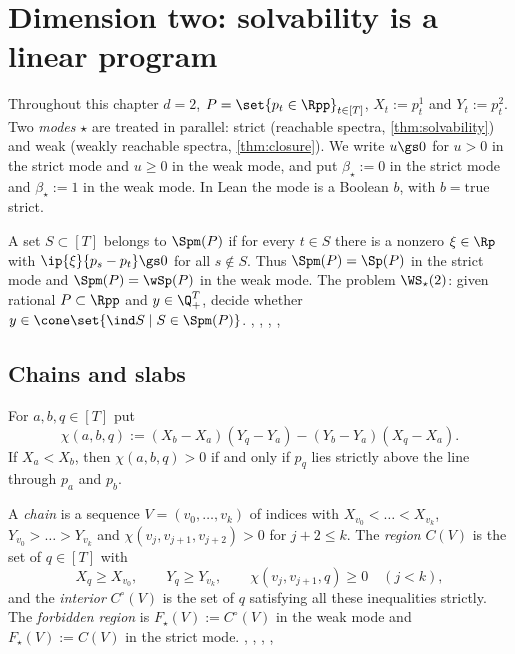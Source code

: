 \section{Dimension two: solvability is a linear program}\label{sec:planar}

Throughout this chapter $d=2$, $P=\set{p_t\in\Rpp}_{t\in[T]}$, $X_t:=p_t^1$ and $Y_t:=p_t^2$. Two \emph{modes} $\star$ are treated in parallel: strict (reachable spectra, \cref{thm:solvability}) and weak (weakly reachable spectra, \cref{thm:closure}). We write $u\gs0$ for $u>0$ in the strict mode and $u\ge0$ in the weak mode, and put $\beta_\star:=0$ in the strict mode and $\beta_\star:=1$ in the weak mode. In Lean the mode is a Boolean $b$, with $b=\mathrm{true}$ strict.

\begin{definition}\label{def:modes}
A set $S\subset[T]$ belongs to $\Spm(P)$ if for every $t\in S$ there is a nonzero $\xi\in\Rp$ with $\ip{\xi}{p_s-p_t}\gs0$ for all $s\notin S$. Thus $\Spm(P)=\Sp(P)$ in the strict mode and $\Spm(P)=\wSp(P)$ in the weak mode. The problem $\WS_\star(2)$: given rational $P\subset\Rpp$ and $y\in\Q^T_+$, decide whether $y\in\cone\set{\ind S\mid S\in\Spm(P)}$. \hfill{}, , , , 
\end{definition}

\subsection{Chains and slabs}

For $a,b,q\in[T]$ put
\[
\chi(a,b,q):=(X_b-X_a)(Y_q-Y_a)-(Y_b-Y_a)(X_q-X_a).
\]
If $X_a<X_b$, then $\chi(a,b,q)>0$ if and only if $p_q$ lies strictly above the line through $p_a$ and $p_b$.

\begin{definition}[chain]\label{def:chain}
A \emph{chain} is a sequence $V=(v_0,\dots,v_k)$ of indices with $X_{v_0}<\dots<X_{v_k}$, $Y_{v_0}>\dots>Y_{v_k}$ and $\chi(v_j,v_{j+1},v_{j+2})>0$ for $j+2\le k$. The \emph{region} $C(V)$ is the set of $q\in[T]$ with
\[
X_q\ge X_{v_0},\qquad Y_q\ge Y_{v_k},\qquad \chi(v_j,v_{j+1},q)\ge0\quad(j<k),
\]
and the \emph{interior} $C^\circ(V)$ is the set of $q$ satisfying all these inequalities strictly. The \emph{forbidden region} is $F_\star(V):=C^\circ(V)$ in the weak mode and $F_\star(V):=C(V)$ in the strict mode. \hfill{}, , , , 
\end{definition}


